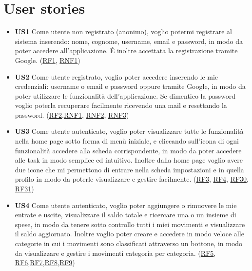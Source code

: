 \documentclass[a4paper,12pt]{article}
\begin{document}
\section*{User stories}
\begin{itemize} \setlength\itemsep{0.01em}
\item \textbf {US1} Come utente non registrato (anonimo), voglio potermi registrare al sistema inserendo: nome, cognome, username, email e password, in modo da poter accedere all'applicazione. É inoltre accettata la registrazione tramite Google. (\hyperlink{RF1}{RF1}, \hyperlink{RNF1}{RNF1})

\begin{center}
\end{center}

\item\textbf {US2} Come utente registrato, voglio poter accedere inserendo le mie credenziali: username o email e password oppure tramite Google, in modo da poter utilizzare le funzionalità dell'applicazione. Se dimentico la password voglio poterla recuperare facilmente ricevendo una mail e resettando la password. (\hyperlink{RF2}{RF2},\hyperlink{RNF1}{RNF1}, \hyperlink{RNF2}{RNF2}, \hyperlink{RNF3}{RNF3})

\begin{center}
\end{center}


\item \textbf {US3} Come utente autenticato, voglio poter visualizzare tutte le funzionalità nella home page sotto forma di menù iniziale, e cliccando sull'icona di ogni funzionalità accedere alla scheda corrispondente, in modo da poter accedere alle task in modo semplice ed intuitivo. Inoltre dalla home page voglio avere due icone che mi permettono di entrare nella scheda impostazioni e in quella profilo in modo da poterle visualizzare e gestire facilmente. (\hyperlink{RF3}{RF3}, \hyperlink{RF4}{RF4}, \hyperlink{RF30}{RF30}, \hyperlink{RF31}{RF31})

\begin{center}
\end{center}

\item \textbf {US4} Come utente autenticato, voglio poter aggiungere o rimuovere le mie entrate e uscite, visualizzare il saldo totale e ricercare una o un insieme di spese, in modo da tenere sotto controllo tutti i miei movimenti e visualizzare il saldo aggiornato. Inoltre voglio poter creare e accedere in modo veloce alle categorie in cui i movimenti sono classificati attraverso un bottone, in modo da visualizzare e gestire i movimenti categoria per categoria. (\hyperlink{RF5}{RF5}, \hyperlink{RF6}{RF6},\hyperlink{RF7}{RF7},\hyperlink{RF8}{RF8},\hyperlink{RF9}{RF9})


\end{itemize}
\end{document}
